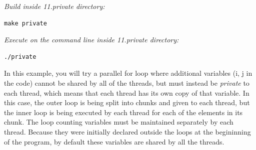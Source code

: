 \documentclass[letterpaper,10pt,openany,oneside]{sphinxmanual}
\begin{document}
\emph{Build inside 11.private directory:}

\begin{Verbatim}[commandchars=\\\{\}]
make private
\end{Verbatim}

\emph{Execute on the command line inside 11.private directory:}

\begin{Verbatim}[commandchars=\\\{\}]
./private
\end{Verbatim}

In this example, you will try a parallel for loop where additional variables (i, j in the code) cannot be shared by all of the threads, but must instead be \emph{private} to each thread, which means that each thread has its own copy of that variable.  In this case, the outer loop is being split into chunks and given to each thread, but the inner loop is being executed by each thread for each of the elements in its chunk.  The loop counting variables must be maintained separately by each thread.  Because they were initially declared outside the loops at the begininning of the program, by default these variables are shared by all the threads.
\end{document}
